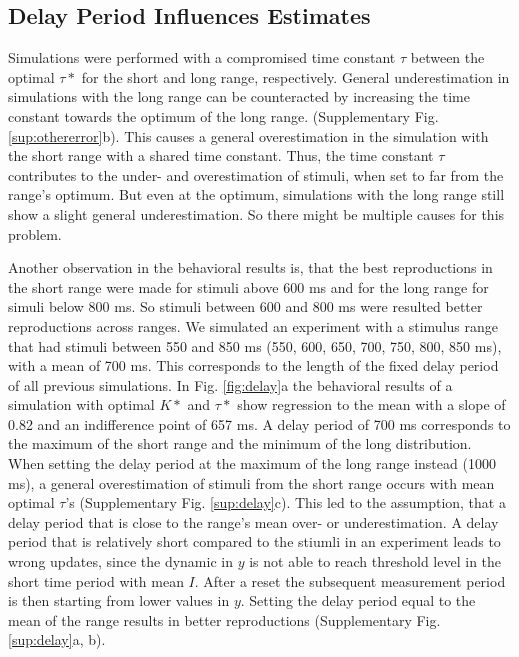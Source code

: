 \documentclass[10pt]{article}
\begin{document}
\subsection{Delay Period Influences Estimates}
Simulations were performed with a compromised time constant $\tau$ between the optimal $\tau*$ for the short and long range, respectively.
General underestimation in simulations with the long range can be counteracted by increasing the time constant towards the optimum of the long range. (Supplementary Fig. \ref{sup:othererror}b). This causes a general overestimation in the simulation with the short range with a shared time constant. 
Thus, the time constant $\tau$ contributes to the under- and overestimation of stimuli, when set to far from the range's optimum. But even at the optimum, simulations with the long range still show a slight general underestimation.
So there might be multiple causes for this problem.

Another observation in the behavioral results is, that the best reproductions in the short range were made for stimuli above 600 ms and for the long range for simuli below 800 ms. So stimuli between 600 and 800 ms were resulted better reproductions  across ranges. 
We simulated an experiment with a stimulus range that had stimuli between 550 and 850 ms (550, 600, 650, 700, 750, 800, 850 ms), with a mean of 700 ms. This corresponds to the length of the fixed delay period of all previous simulations. In Fig. \ref{fig:delay}a the behavioral results of a simulation with optimal $K*$ and $\tau*$ show regression to the mean with a slope of 0.82 and an indifference point of 657 ms.
A delay period of 700 ms corresponds to the maximum of the short range and the minimum of the long distribution. 
When setting the delay period at the maximum of the long range instead (1000 ms), a general overestimation of stimuli from the short range occurs with mean optimal $\tau$'s (Supplementary Fig. \ref{sup:delay}c).
This led to the assumption, that a delay period that is close to the range's mean over- or underestimation. 
A delay period that is relatively short compared to the stiumli in an experiment leads to wrong updates, since the dynamic in $y$ is not able to reach threshold level in the short time period with mean $I$. 
After a reset the subsequent measurement period is then starting from lower values in $y$. 
Setting the delay period equal to the mean of the range results in better reproductions 
(Supplementary Fig. \ref{sup:delay}a, b).
\end{document}
